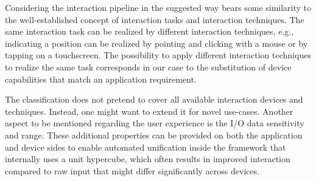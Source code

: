 \documentclass[twoside,twocolumn,10pt]{article}
\begin{document}
Considering the interaction pipeline in the suggested way bears some similarity to the well-established concept of interaction tasks and interaction techniques.
The same interaction task can be realized by different interaction techniques, e.g., indicating a position can be realized by pointing and clicking with a mouse or by tapping on a touchscreen. The possibility to apply different interaction techniques to realize the same task corresponds in our case to the substitution of device capabilities that match an application requirement.


The classification does not pretend to cover all available interaction devices and techniques. Instead, one might want to extend it for novel use-cases. Another aspect to be mentioned regarding the user experience is the I/O data sensitivity and range. These additional properties can be provided on both the application and device sides to enable automated unification inside the framework that internally uses a unit hypercube, which often results in improved interaction compared to raw input that might differ significantly across devices.



\end{document}
